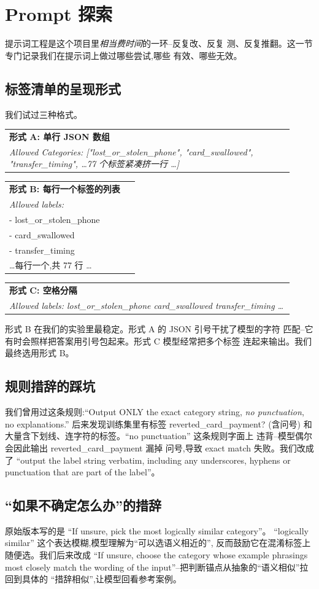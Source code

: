 \documentclass[10pt,twocolumn,letterpaper]{article}
\makeatletter
\newcommand{\promptbox}[2][\textbf{提示词示例}]{%
  \par\medskip\noindent
  \begin{tabular}{@{}|@{\hspace{4pt}}p{0.92\linewidth}@{\hspace{4pt}}|@{}}
  \hline
  \rule{0pt}{2.6ex}\textbf{\color{promptclr}#1}\\[2pt]
  \small\itshape #2 \\[2pt]
  \hline
  \end{tabular}
  \par\medskip
}
\makeatother
\begin{document}
\section{Prompt 探索}
\label{sec:prompt}

提示词工程是这个项目里\emph{相当费时间}的一环--反复改、反复
测、反复推翻。这一节专门记录我们在提示词上做过哪些尝试,哪些
有效、哪些无效。

\subsection{标签清单的呈现形式}
我们试过三种格式。

\promptbox[\textbf{形式 A: 单行 JSON 数组}]{%
Allowed Categories: ["lost\_or\_stolen\_phone", "card\_swallowed",
"transfer\_timing", \dots 77 个标签紧凑挤一行 \dots]
}

\promptbox[\textbf{形式 B: 每行一个标签的列表}]{%
Allowed labels:\\
- lost\_or\_stolen\_phone\\
- card\_swallowed\\
- transfer\_timing\\
\dots 每行一个,共 77 行 \dots
}

\promptbox[\textbf{形式 C: 空格分隔}]{%
Allowed labels: lost\_or\_stolen\_phone card\_swallowed
transfer\_timing \dots
}

形式 B 在我们的实验里最稳定。形式 A 的 JSON 引号干扰了模型的字符
匹配--它有时会照样把答案用引号包起来。形式 C 模型经常把多个标签
连起来输出。我们最终选用形式 B。

\subsection{规则措辞的踩坑}
我们曾用过这条规则:``Output ONLY the exact category string,
\emph{no punctuation}, no explanations.''
后来发现训练集里有标签 reverted\_card\_payment? (含问号)
和大量含下划线、连字符的标签。``no punctuation'' 这条规则字面上
违背--模型偶尔会因此输出 reverted\_card\_payment 漏掉
问号,导致 exact match 失败。我们改成了 ``output the label string
verbatim, including any underscores, hyphens or punctuation that are
part of the label''。

\subsection{``如果不确定怎么办''的措辞}
原始版本写的是 ``If unsure, pick the most logically similar category''。
``logically similar'' 这个表达模糊,模型理解为``可以选语义相近的'',
反而鼓励它在混淆标签上随便选。我们后来改成 ``If unsure, choose
the category whose example phrasings most closely match the wording
of the input''--把判断锚点从抽象的``语义相似''拉回到具体的
``措辞相似'',让模型回看参考案例。
\end{document}
